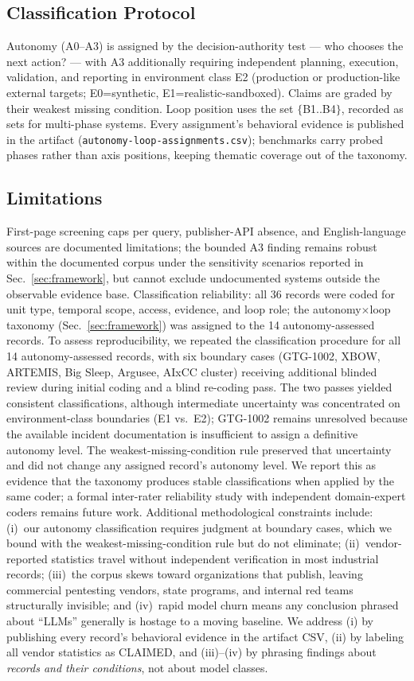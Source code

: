 \documentclass[conference,compsoc]{IEEEtran}
\begin{document}
\subsection{Classification Protocol}
Autonomy (A0--A3) is assigned by the decision-authority test --- who chooses the next action? ---
with A3 additionally requiring independent planning, execution, validation, and reporting in
environment class E2 (production or production-like external targets; E0=synthetic,
E1=realistic-sandboxed). Claims are graded by their weakest missing condition. Loop position
uses the set $\{$B1..B4$\}$, recorded as sets for multi-phase systems. Every assignment's
behavioral evidence is published in the artifact (\texttt{autonomy-loop-assignments.csv});
benchmarks carry probed phases rather than axis positions, keeping thematic coverage out of the
taxonomy.

\subsection{Limitations}
First-page screening caps per query, publisher-API absence, and English-language sources are
 documented limitations; the bounded A3 finding remains robust within the documented corpus under the sensitivity scenarios reported in Sec.~\ref{sec:framework}, but cannot exclude undocumented systems outside the observable evidence base.
 Classification reliability: all 36 records were coded for unit type, temporal scope, access,
 evidence, and loop role; the autonomy$\times$loop taxonomy (Sec.~\ref{sec:framework}) was
 assigned to the 14 autonomy-assessed records. To assess reproducibility, we
 repeated the classification procedure for all 14 autonomy-assessed records, with six boundary
 cases (GTG-1002, XBOW, ARTEMIS, Big Sleep, Argusee, AIxCC cluster) receiving additional
 blinded review during initial coding and a blind re-coding pass. The two passes yielded consistent
 classifications, although intermediate uncertainty was concentrated on environment-class
 boundaries (E1 vs.\ E2); GTG-1002 remains unresolved because the available incident
 documentation is insufficient to assign a definitive autonomy level. The
 weakest-missing-condition rule preserved that uncertainty and did not change any
 assigned record's autonomy level. We report this as evidence that the taxonomy produces stable
 classifications when applied by the same coder; a formal inter-rater reliability study with
 independent domain-expert coders remains future work. Additional methodological constraints include:
(i)~our autonomy classification requires judgment at boundary cases, which we bound with the
weakest-missing-condition rule but do not eliminate; (ii)~vendor-reported statistics travel
without independent verification in most industrial records; (iii)~the corpus skews toward
organizations that publish, leaving commercial pentesting vendors, state programs, and internal
red teams structurally invisible; and (iv)~rapid model churn means any conclusion phrased about
``LLMs'' generally is hostage to a moving baseline. We address (i) by publishing every record's
behavioral evidence in the artifact CSV, (ii) by labeling all vendor statistics as CLAIMED, and
(iii)--(iv) by phrasing findings about \emph{records and their conditions}, not about model classes.
\end{document}
